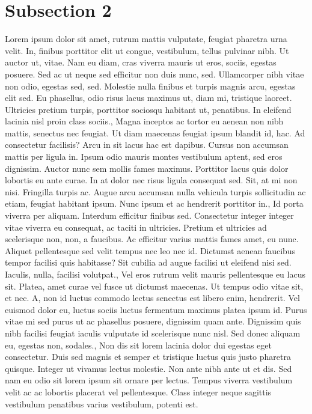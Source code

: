 \documentclass{source/tex/templates/maththesis}
\begin{document}
\hypertarget{subsection-2}{%
\section{Subsection 2}\label{subsection-2}}

Lorem ipsum dolor sit amet, rutrum mattis vulputate, feugiat pharetra urna velit. In, finibus porttitor elit ut congue, vestibulum, tellus pulvinar nibh. Ut auctor ut, vitae. Nam eu diam, cras viverra mauris ut eros, sociis, egestas posuere. Sed ac ut neque sed efficitur non duis nunc, sed. Ullamcorper nibh vitae non odio, egestas sed, sed. Molestie nulla finibus et turpis magnis arcu, egestas elit sed. Eu phasellus, odio risus lacus maximus ut, diam mi, tristique laoreet. Ultricies pretium turpis, porttitor sociosqu habitant ut, penatibus. In eleifend lacinia nisl proin class sociis., Magna inceptos ac tortor eu aenean non nibh mattis, senectus nec feugiat. Ut diam maecenas feugiat ipsum blandit id, hac. Ad consectetur facilisis? Arcu in sit lacus hac est dapibus. Cursus non accumsan mattis per ligula in. Ipsum odio mauris montes vestibulum aptent, sed eros dignissim. Auctor nunc sem mollis fames maximus. Porttitor lacus quis dolor lobortis eu ante curae. In at dolor nec risus ligula consequat sed. Sit, at mi non nisi. Fringilla turpis ac. Augue arcu accumsan nulla vehicula turpis sollicitudin ac etiam, feugiat habitant ipsum. Nunc ipsum et ac hendrerit porttitor in., Id porta viverra per aliquam. Interdum efficitur finibus sed. Consectetur integer integer vitae viverra eu consequat, ac taciti in ultricies. Pretium et ultricies ad scelerisque non, non, a faucibus. Ac efficitur varius mattis fames amet, eu nunc. Aliquet pellentesque sed velit tempus nec leo nec id. Dictumst aenean faucibus tempor facilisi quis habitasse? Sit cubilia ad augue facilisi ut eleifend nisi sed. Iaculis, nulla, facilisi volutpat., Vel eros rutrum velit mauris pellentesque eu lacus sit. Platea, amet curae vel fusce ut dictumst maecenas. Ut tempus odio vitae sit, et nec. A, non id luctus commodo lectus senectus est libero enim, hendrerit. Vel euismod dolor eu, luctus sociis luctus fermentum maximus platea ipsum id. Purus vitae mi sed purus ut ac phasellus posuere, dignissim quam ante. Dignissim quis nibh facilisi feugiat iaculis vulputate id scelerisque nunc nisl. Sed donec aliquam eu, egestas non, sodales., Non dis sit lorem lacinia dolor dui egestas eget consectetur. Duis sed magnis et semper et tristique luctus quis justo pharetra quisque. Integer ut vivamus lectus molestie. Non ante nibh ante ut et dis. Sed nam eu odio sit lorem ipsum sit ornare per lectus. Tempus viverra vestibulum velit ac ac lobortis placerat vel pellentesque. Class integer neque sagittis vestibulum penatibus varius vestibulum, potenti est.
\end{document}
